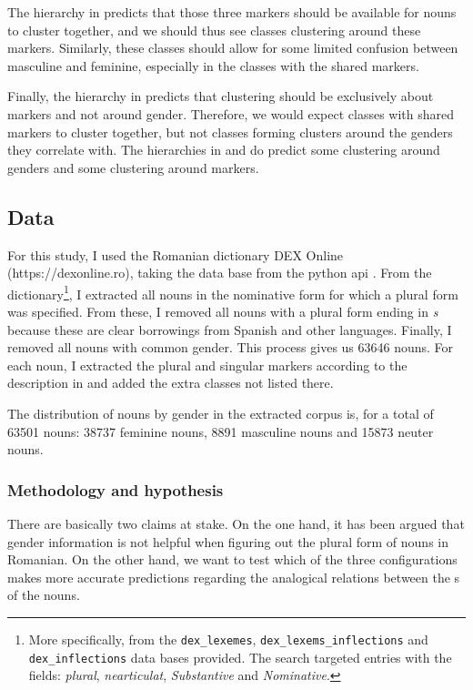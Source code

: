The hierarchy in  predicts that those three markers should be available for nouns to cluster together, and we should thus see classes clustering around these markers. Similarly, these classes should allow for some limited confusion between masculine and feminine, especially in the classes with the shared markers.

Finally, the hierarchy in  predicts that clustering should be exclusively about markers and not around gender. Therefore, we would expect classes with shared markers to cluster together, but not classes forming clusters around the genders they correlate with. The hierarchies in  and  do predict some clustering around genders and some clustering around markers.

\subsection{Data}

For this study, I used the Romanian dictionary DEX Online (https://dexonline.ro), taking the data base from the python api \autocite{Navalici.2013}. From the dictionary\footnote{More specifically, from the \texttt{dex\_lexemes}, \texttt{dex\_lexems\_inflections} and \texttt{dex\_inflections} data bases provided. The search targeted entries with the fields: \textit{plural}, \textit{nearticulat}, \textit{Substantive} and \textit{Nominative}.}, I extracted all nouns in the nominative form for which a plural form was specified. From these, I removed all nouns with a plural form ending in \textit{s} because these are clear borrowings from Spanish and other languages. Finally, I removed all nouns with common gender. This process gives us 63646 nouns. For each noun, I extracted the plural and singular markers according to the description in \textcite{Cojocaru.2003} and added the extra classes not listed there.

The distribution of nouns by gender in the extracted corpus is, for a total of 63501 nouns: 38737 feminine nouns, 8891 masculine nouns and 15873 neuter nouns.

\subsubsection{Methodology and hypothesis}

There are basically two claims at stake. On the one hand, it has been argued that gender information is not helpful when figuring out the plural form of nouns in Romanian. On the other hand, we want to test which of the three  configurations makes more accurate predictions regarding the analogical relations between the s of the nouns.

